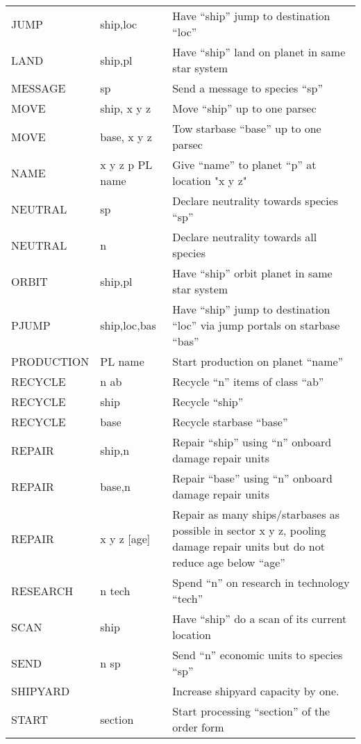 \documentclass[10pt,titlepage]{article}
\begin{document}
\begin{longtable}{|llp{9cm}|}
JUMP     &       ship,loc     &   Have ``ship'' jump to destination ``loc'' \\
LAND     &       ship,pl      &   Have ``ship'' land on planet in same star system \\
MESSAGE  &       sp           &   Send a message to species ``sp'' \\
MOVE     &       ship, x y z  &   Move ``ship'' up to one parsec \\
MOVE     &       base, x y z  &   Tow starbase ``base'' up to one parsec \\
NAME     &       x y z p PL name &  Give ``name'' to planet ``p'' at location "x y z" \\
NEUTRAL  &       sp           &   Declare neutrality towards species ``sp'' \\
NEUTRAL  &       n            &   Declare neutrality towards all species \\
ORBIT    &       ship,pl      &   Have ``ship'' orbit planet in same star system \\
PJUMP    &       ship,loc,bas &   Have ``ship'' jump to destination ``loc'' via jump portals on starbase ``bas'' \\
PRODUCTION &     PL name   &      Start production on planet ``name'' \\
RECYCLE    &     n ab      &      Recycle ``n'' items of class ``ab'' \\
RECYCLE    &     ship      &      Recycle ``ship'' \\
RECYCLE    &     base      &      Recycle starbase ``base'' \\
REPAIR     &     ship,n    &      Repair ``ship'' using ``n'' onboard damage repair units \\
REPAIR    &      base,n     &     Repair ``base'' using ``n'' onboard damage repair units \\
REPAIR    &      x y z [age]&     Repair as many ships/starbases as possible in sector x y z, pooling damage repair units but do not reduce age below ``age'' \\
RESEARCH  &      n tech    &      Spend ``n'' on research in technology ``tech'' \\
SCAN      &      ship      &      Have ``ship'' do a scan of its current location \\
SEND      &      n sp      &      Send ``n'' economic units to species ``sp'' \\
SHIPYARD  &                &      Increase shipyard capacity by one. \\
START     &      section     &    Start processing ``section'' of the order form \\

\end{longtable}
\end{document}
